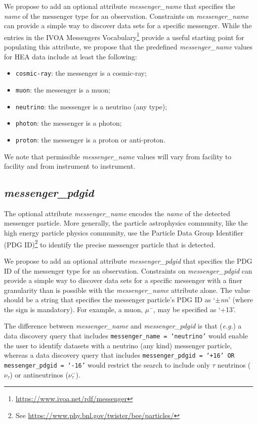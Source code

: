 \documentclass[11pt,a4paper]{ivoa}
\begin{document}
We propose to add an optional attribute {\em messenger\_name\/} that specifies the {\em name} of the messenger type for an observation.  Constraints on {\em messenger\_name\/} can provide a simple way to discover data sets for a specific messenger.  While the entries in the IVOA Messengers Vocabulary\footnote{\url{https://www.ivoa.net/rdf/messenger}} provide a useful starting point for populating this attribute, we propose that the predefined {\em messenger\_name\/} values for \gls{HEA} data include at least the following:
\begin{itemize}
	\item \texttt{cosmic-ray}: the messenger is a cosmic-ray;
	\item \texttt{muon}: the messenger is a muon;
	\item \texttt{neutrino}: the messenger is a neutrino (any type);
	\item \texttt{photon}: the messenger is a photon;
	\item \texttt{proton}: the messenger is a proton or anti-proton.
\end{itemize}
We note that permissible {\em messenger\_name\/} values will vary from facility to facility and from instrument to instrument.

\subsection{{\em messenger\_pdgid}}
\label{sec:messenger_pdgid}

The optional attribute {\em messenger\_name\/} encodes the {\em name\/} of the detected messenger particle.  More generally, the particle astrophysics community, like the high energy particle physics community,  use the Particle Data Group Identifier (PDG ID)\footnote{See \url{https://www.phy.bnl.gov/twister/bee/particles/}} to identify the precise messenger particle that is detected.  

We propose to add an optional attribute {\em messenger\_pdgid\/} that specifies the PDG ID of the messenger type for an observation.  Constraints on {\em messenger\_pdgid\/} can provide a simple way to discover data sets for a specific messenger with a finer granularity than is possible with the {\em messenger\_name\/} attribute alone.  The value should be a string that specifies the messenger particle's PDG ID as `{\em $\pm$nn\/}' (where the sign is mandatory).  For example, a muon, $\mu^{-}$, may be specified as `+13'. 

The difference between {\em messenger\_name\/} and {\em messenger\_pdgid} is that ({\em e.g.\/}\null) a data discovery query that includes {\tt messenger\_name = `neutrino'} would enable the user to identify datasets with a neutrino (any kind) messenger particle, whereas a data discovery query that includes {\tt messenger\_pdgid = `+16' OR messenger\_pdgid = `-16'} would restrict the search to include only $\tau$ neutrinos ($\nu_\tau$) or antineutrinos ($\nu_\tau^{-}$).
\end{document}

